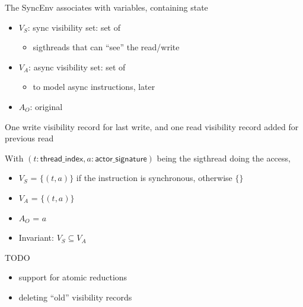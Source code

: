 \begin{minipage}[t]{0.48\textwidth}\fixminipage
The SyncEnv associates  with variables, containing state
\begin{itemize}
  \item $V_S$: sync visibility set: set of 
  \begin{itemize}
    \item sigthreads that can ``see'' the read/write
  \end{itemize}
  \item $V_A$: async visibility set: set of 
  \begin{itemize}
    \item to model async instructions, later
  \end{itemize}
  \item $A_O$: original 
\end{itemize}

One write visibility record for last write, and one read visibility record added for  previous read

With $(t: \mathsf{thread\_index}, a: \mathsf{actor\_signature})$ being the sigthread doing the access, 
\begin{itemize}
  \item $V_S$ = $\{(t,a)\}$ if the instruction is synchronous, otherwise $\{\}$
  \item $V_A$ = $\{(t,a)\}$
  \item $A_O$ = $a$
  \item Invariant: $V_S \subseteq V_A$
\end{itemize}
TODO
\begin{itemize}
  \item support for atomic reductions
  \item deleting ``old'' visibility records
\end{itemize}
\end{minipage}
\hfill
